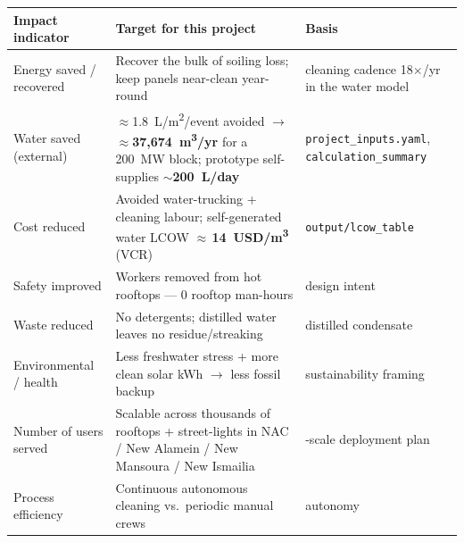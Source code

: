 \documentclass[11pt]{article}
\begin{document}
\noindent{}

\vspace{6pt}
\noindent\begin{tabular}{@{}>{\raggedright}p{3.6cm} >{\raggedright}p{8.0cm} >{\raggedright\arraybackslash}p{4.4cm}@{}}
\toprule
\textbf{Impact indicator} & \textbf{Target for this project} & \textbf{Basis} \\
\midrule
Energy saved / recovered & Recover the bulk of soiling loss; keep panels near-clean year-round & cleaning cadence 18$\times$/yr in the water model \\
Water saved (external) & $\approx$1.8~L/m\textsuperscript{2}/event avoided $\rightarrow$ $\approx$\textbf{37{,}674~m\textsuperscript{3}/yr} for a 200~MW block; prototype self-supplies $\sim$\textbf{200~L/day} & \texttt{project\_inputs.yaml}, \texttt{calculation\_summary} \\
Cost reduced & Avoided water-trucking + cleaning labour; self-generated water LCOW $\approx$\,\textbf{14~USD/m\textsuperscript{3}} (VCR) & \texttt{output/lcow\_table} \\
Safety improved & Workers removed from hot rooftops --- 0 rooftop man-hours & design intent \\
Waste reduced & No detergents; distilled water leaves no residue/streaking & distilled condensate \\
Environmental / health & Less freshwater stress + more clean solar kWh $\rightarrow$ less fossil backup & sustainability framing \\
Number of users served & Scalable across thousands of rooftops + street-lights in NAC / New Alamein / New Mansoura / New Ismailia & 3-scale deployment plan \\
Process efficiency & Continuous autonomous cleaning vs.\ periodic manual crews & autonomy \\
\bottomrule
\end{tabular}

\vspace{8pt}
\noindent{}
\end{document}
